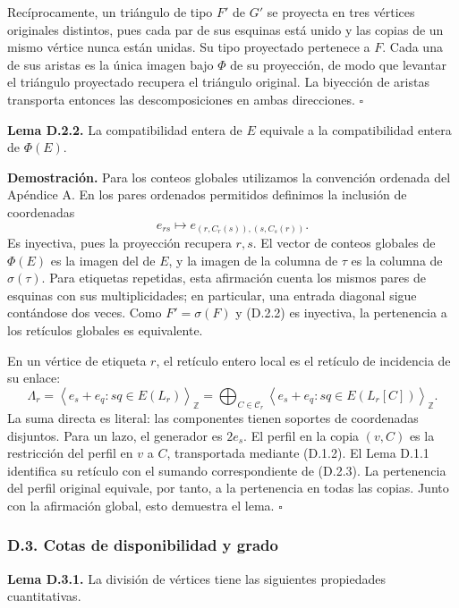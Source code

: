 \documentclass[spanish,11pt,a4paper]{article}
\begin{document}
Recíprocamente, un triángulo de tipo \(F'\) de \(G'\) se proyecta en tres vértices originales distintos, pues cada par de sus esquinas está unido y las copias de un mismo vértice nunca están unidas. Su tipo proyectado pertenece a \(F\). Cada una de sus aristas es la única imagen bajo \(\Phi\) de su proyección, de modo que levantar el triángulo proyectado recupera el triángulo original. La biyección de aristas transporta entonces las descomposiciones en ambas direcciones. \(\square\)

\textbf{Lema D.2.2.} La compatibilidad entera de \(E\) equivale a la compatibilidad entera de \(\Phi(E)\).

\textbf{Demostración.} Para los conteos globales utilizamos la convención ordenada del Apéndice A. En los pares ordenados permitidos definimos la inclusión de coordenadas \[e_{rs}\longmapsto e_{(r,C_r(s)),(s,C_s(r))}.
\tag{D.2.2}\] Es inyectiva, pues la proyección recupera \(r,s\). El vector de conteos globales de \(\Phi(E)\) es la imagen del de \(E\), y la imagen de la columna de \(\tau\) es la columna de \(\sigma(\tau)\). Para etiquetas repetidas, esta afirmación cuenta los mismos pares de esquinas con sus multiplicidades; en particular, una entrada diagonal sigue contándose dos veces. Como \(F'=\sigma(F)\) y (D.2.2) es inyectiva, la pertenencia a los retículos globales es equivalente.

En un vértice de etiqueta \(r\), el retículo entero local es el retículo de incidencia de su enlace: \[\Lambda_r=\left\langle e_s+e_q:sq\in E(L_r)\right\rangle_{\mathbb Z}
=\bigoplus_{C\in\mathcal C_r}
\left\langle e_s+e_q:sq\in E(L_r[C])\right\rangle_{\mathbb Z}.
\tag{D.2.3}\] La suma directa es literal: las componentes tienen soportes de coordenadas disjuntos. Para un lazo, el generador es \(2e_s\). El perfil en la copia \((v,C)\) es la restricción del perfil en \(v\) a \(C\), transportada mediante (D.1.2). El Lema D.1.1 identifica su retículo con el sumando correspondiente de (D.2.3). La pertenencia del perfil original equivale, por tanto, a la pertenencia en todas las copias. Junto con la afirmación global, esto demuestra el lema. \(\square\)

\subsubsection{D.3. Cotas de disponibilidad y grado}\label{d.3.-cotas-de-disponibilidad-y-grado}

\textbf{Lema D.3.1.} La división de vértices tiene las siguientes propiedades cuantitativas.
\end{document}
